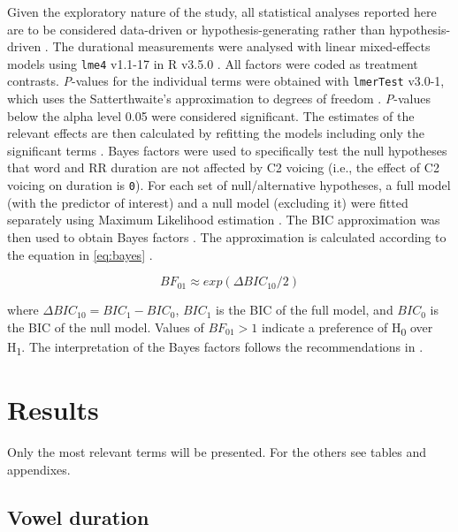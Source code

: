 \documentclass[]{JASAnew}
\begin{document}
Given the exploratory nature of the study, all statistical analyses
reported here are to be considered data-driven or hypothesis-generating
rather than hypothesis-driven \citep{kerr1998}. The durational
measurements were analysed with linear mixed-effects models using
\texttt{lme4} v1.1-17 in R v3.5.0 \citep{r-core-team2018, bates2015}.
All factors were coded as treatment contrasts. \emph{P}-values for the
individual terms were obtained with \texttt{lmerTest} v3.0-1, which uses
the Satterthwaite's approximation to degrees of freedom
\citep{kuznetsova2017}. \emph{P}-values below the alpha level 0.05 were
considered significant. The estimates of the relevant effects are then
calculated by refitting the models including only the significant terms
\citep[step-down approach,][pp.~121--122]{diggle2002, zuur2009}. Bayes
factors were used to specifically test the null hypotheses that word and
RR duration are not affected by C2 voicing (i.e., the effect of C2
voicing on duration is \texttt{0}). For each set of null/alternative
hypotheses, a full model (with the predictor of interest) and a null
model (excluding it) were fitted separately using Maximum Likelihood
estimation \citep[p.~34]{bates2015}. The BIC approximation was then used
to obtain Bayes factors
\citep{raftery1995, raftery1999, wagenmakers2007, jarosz2014}. The
approximation is calculated according to the equation in \ref{eq:bayes}
\citep[p.~796]{wagenmakers2007}.

\begin{equation}
\label{eq:bayes}
BF_{01} \approx exp(\Delta{}BIC_{10}/2)
\end{equation}

where \(\Delta{}BIC_{10} = BIC_1 - BIC_0\), \(BIC_1\) is the BIC of the
full model, and \(BIC_0\) is the BIC of the null model. Values of
\(BF_{01} > 1\) indicate a preference of H\textsubscript{0} over
H\textsubscript{1}. The interpretation of the Bayes factors follows the
recommendations in \citet[p.~139]{raftery1995}.

\hypertarget{results}{%
\section{Results}\label{results}}

Only the most relevant terms will be presented. For the others see
tables and appendixes.

\hypertarget{vowel-duration}{%
\subsection{Vowel duration}\label{vowel-duration}}
\end{document}
